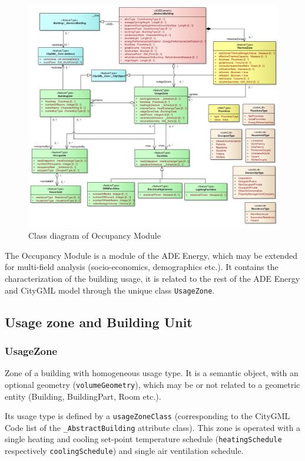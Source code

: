 \documentclass[a4paper,12pt]{article}
\begin{document}
\begin{figure}[htbp]
\centering
\includegraphics{fig/class_occupancy.png}
\caption{Class diagram of Occupancy Module}
\end{figure}

The Occupancy Module is a module of the ADE Energy, which may be
extended for multi-field analysis (socio-economics, demographics etc.).
It contains the characterization of the building usage, it is related to
the rest of the ADE Energy and CityGML model through the unique class
\texttt{UsageZone}.

\subsection{Usage zone and Building
Unit}\label{usage-zone-and-building-unit}

\subsubsection{UsageZone}\label{usagezone}

Zone of a building with homogeneous usage type. It is a semantic object,
with an optional geometry (\texttt{volumeGeometry}), which may be or not
related to a geometric entity (Building, BuildingPart, Room etc.).

Its usage type is defined by a \texttt{usageZoneClass} (corresponding to
the CityGML Code list of the \texttt{\_AbstractBuilding} attribute
class). This zone is operated with a single heating and cooling
set-point temperature schedule (\texttt{heatingSchedule} respectively
\texttt{coolingSchedule}) and single air ventilation schedule.
\end{document}

